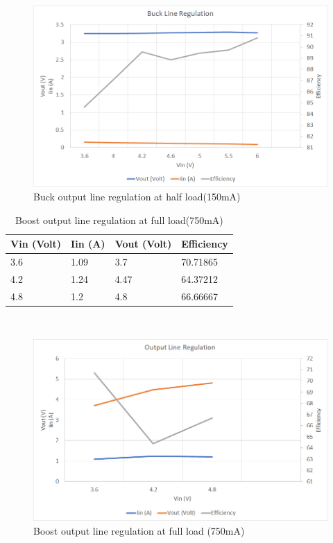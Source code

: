 \\
\begin{figure}[H]
	\centering
	\includegraphics[width=\columnwidth]{IMGS/Buck output line regulation at half load (150mA).png}
	\caption{Buck output line regulation at half load(150mA)}
	\label{fig:arch}
\end{figure}
\pagebreak

\begin{table}[H]
\centering
\begin{tabular}{|l|l|l|l|}
\hline
Vin (Volt) & Iin (A) & Vout (Volt) & Efficiency \\ \hline
3.6        & 1.09    & 3.7         & 70.71865   \\ \hline
4.2        & 1.24    & 4.47        & 64.37212   \\ \hline
4.8        & 1.2     & 4.8         & 66.66667   \\ \hline
\end{tabular}
\caption{Boost output line regulation at full load(750mA)}
\label{table:4}
\end{table}
\\

\begin{figure}[H]
	\centering
	\includegraphics[width=\columnwidth]{IMGS/Boost output regulation at full load (750mA).png}
	\caption{Boost output line regulation at full load (750mA)}
	\label{fig:arch}
\end{figure}
\pagebreak

